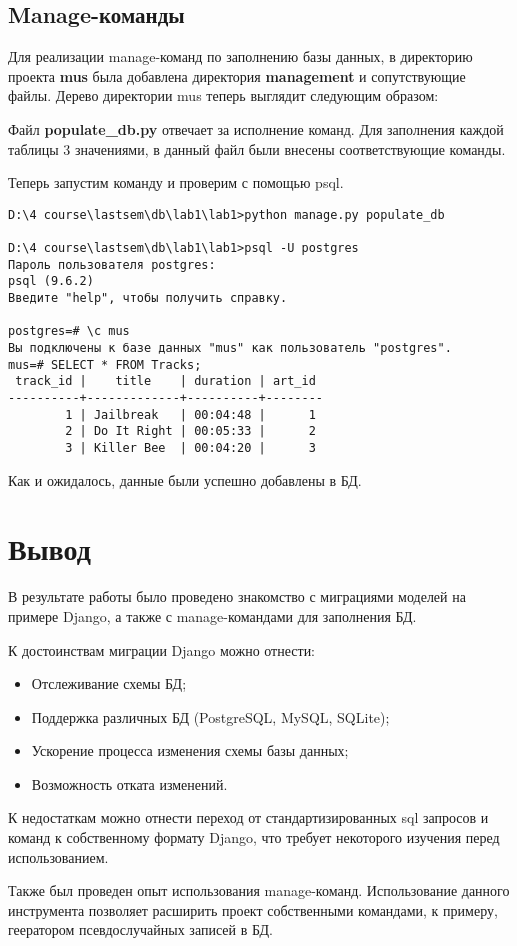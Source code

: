 \subsection{Manage-команды}
Для реализации manage-команд по заполнению базы данных, в директорию проекта \textbf{mus} была добавлена директория \textbf{management} и сопутствующие файлы. Дерево директории mus теперь выглядит следующим образом:


Файл \textbf{populate\_db.py} отвечает за исполнение команд. Для заполнения каждой таблицы 3 значениями, в данный файл были внесены соответствующие команды.



Теперь запустим команду и проверим с помощью psql.

\begin{lstlisting}[caption=Выполнение manage-команды]
D:\4 course\lastsem\db\lab1\lab1>python manage.py populate_db

D:\4 course\lastsem\db\lab1\lab1>psql -U postgres
Пароль пользователя postgres:
psql (9.6.2)
Введите "help", чтобы получить справку.

postgres=# \c mus
Вы подключены к базе данных "mus" как пользователь "postgres".
mus=# SELECT * FROM Tracks;
 track_id |    title    | duration | art_id
----------+-------------+----------+--------
        1 | Jailbreak   | 00:04:48 |      1
        2 | Do It Right | 00:05:33 |      2
        3 | Killer Bee  | 00:04:20 |      3
\end{lstlisting}

 Как и ожидалось, данные были успешно добавлены в БД.

\section{Вывод}
В результате работы было проведено знакомство с миграциями моделей на примере Django, а также с manage-командами для заполнения БД.

К достоинствам миграции Django можно отнести:
\begin{itemize}
	\item Отслеживание схемы БД;
	\item Поддержка различных БД (PostgreSQL, MySQL, SQLite);
	\item Ускорение процесса изменения схемы базы данных;
	\item Возможность отката изменений.
\end{itemize}

К недостаткам можно отнести переход от стандартизированных sql запросов и команд к собственному формату Django, что требует некоторого изучения перед использованием.

Также был проведен опыт использования manage-команд. Использование данного инструмента позволяет расширить проект собственными командами, к примеру, геератором псевдослучайных записей в БД.